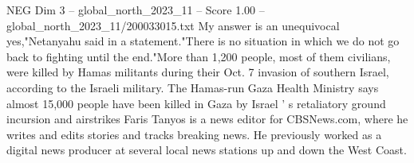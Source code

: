\begin{textsample}{NEG Dim 3 – global\_north\_2023\_11 – Score 1.00 – global\_north\_2023\_11/200033015.txt}
My answer is an unequivocal yes,"Netanyahu said in a statement."There is no situation in which we do not go back to fighting until the end."More than 1,200 people, most of them civilians, were killed by Hamas militants during their Oct. 7 invasion of southern Israel, according to the Israeli military.
The Hamas-run Gaza Health Ministry says almost 15,000 people have been killed in Gaza by Israel ' s retaliatory ground incursion and airstrikes Faris Tanyos is a news editor for CBSNews.com, where he writes and edits stories and tracks breaking news.
He previously worked as a digital news producer at several local news stations up and down the West Coast.

\end{textsample}

